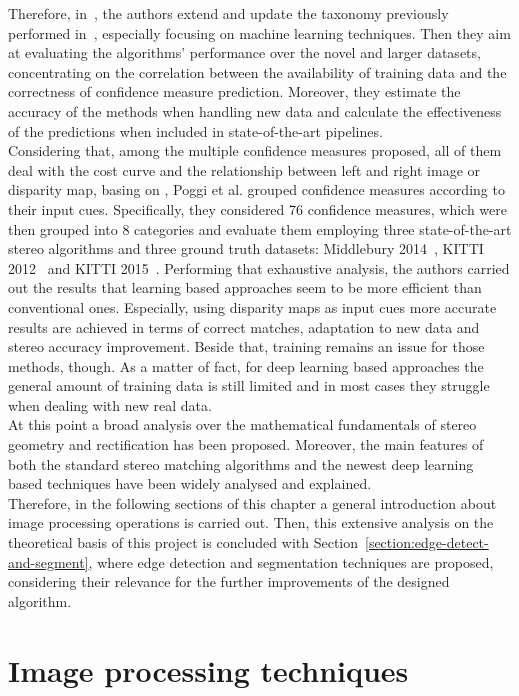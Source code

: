 Therefore, in~\cite{Poggi2017}, the authors extend and update the taxonomy previously performed in~\cite{Hu2012}, especially focusing on machine learning techniques.
Then they aim at evaluating the algorithms' performance over the novel and larger datasets, concentrating on the correlation between the availability of training data and the correctness of confidence measure prediction. 
Moreover, they estimate the accuracy of the methods when handling new data and calculate the effectiveness of the predictions when included in state-of-the-art pipelines.\\
Considering that, among the multiple confidence measures proposed, all of them deal with the cost curve and the relationship between left and right image or disparity map, basing on \cite{Hu2012}, Poggi et al. \cite{Poggi2017} grouped confidence measures according to their input cues. 
Specifically, they considered 76 confidence measures, which were then grouped into 8 categories and evaluate them employing three state-of-the-art stereo algorithms and three ground truth datasets: Middlebury 2014~\cite{Scharstein2014}, KITTI 2012~\cite{geiger2013vision} and KITTI 2015~\cite{menze2015object}.
Performing that exhaustive analysis, the authors carried out the results that learning based approaches seem to be more efficient than conventional ones. 
Especially, using disparity maps as input cues more accurate results are achieved in terms of correct matches, adaptation to new data and stereo accuracy improvement. 
Beside that, training remains an issue for those methods, though. 
As a matter of fact, for deep learning based approaches the general amount of training data is still limited and in most cases they struggle when dealing with new real data.\\
At this point a broad analysis over the mathematical fundamentals of stereo geometry and rectification has been proposed.
Moreover, the main features of both the standard stereo matching algorithms and the newest deep learning based techniques have been widely analysed and explained. \\
Therefore, in the following sections of this chapter a general introduction about image processing operations is carried out.
Then, this extensive analysis on the theoretical basis of this project is concluded with Section~\ref{section:edge-detect-and-segment}, where edge detection and segmentation techniques are proposed, considering their relevance for the further improvements of the designed algorithm.

\section{Image processing techniques}
\label{section:image-proc-technique}

